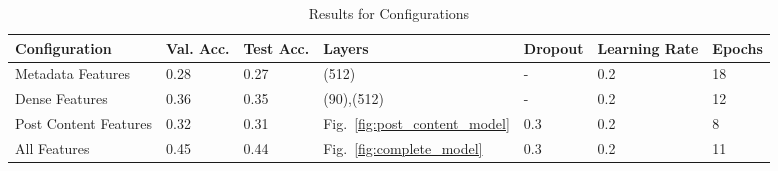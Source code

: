 \documentclass[acmsmall]{acmart}
\begin{document}

\begin{table}[H]
\begin{tabular}{lllllll}
Configuration & Val. Acc. & Test Acc. & Layers & Dropout & Learning Rate & Epochs\\ \hline
Metadata Features & 0.28 & 0.27 & (512) &  - & 0.2 & 18 \\
Dense Features & 0.36 & 0.35 & (90),(512) & - & 0.2 & 12 \\
Post Content Features & 0.32 & 0.31 & Fig.~\ref{fig:post_content_model} & 0.3 & 0.2 & 8 \\
All Features & 0.45 & 0.44 & Fig.~\ref{fig:complete_model} & 0.3 & 0.2 & 11 \\
\end{tabular}
\caption{Results for Configurations}
\label{tab:result_configurations}
\end{table}
\end{document}
